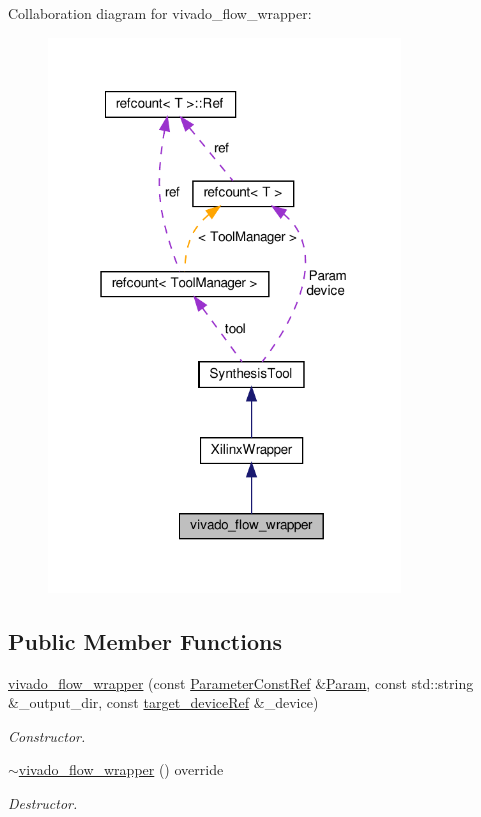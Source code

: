 Collaboration diagram for vivado\+\_\+flow\+\_\+wrapper\+:
\nopagebreak
\begin{figure}[H]
\begin{center}
\leavevmode
\includegraphics[width=265pt]{d2/d19/classvivado__flow__wrapper__coll__graph}
\end{center}
\end{figure}
\subsection*{Public Member Functions}
\begin{DoxyCompactItemize}
\item 
\hyperlink{classvivado__flow__wrapper_a8d308491e66f2a4106dd0105acee3804}{vivado\+\_\+flow\+\_\+wrapper} (const \hyperlink{Parameter_8hpp_a37841774a6fcb479b597fdf8955eb4ea}{Parameter\+Const\+Ref} \&\hyperlink{classSynthesisTool_a854ef102782ff4d069e1aa6d1a94d64e}{Param}, const std\+::string \&\+\_\+output\+\_\+dir, const \hyperlink{target__device_8hpp_acedb2b7a617e27e6354a8049fee44eda}{target\+\_\+device\+Ref} \&\+\_\+device)
\begin{DoxyCompactList}\small\item\em Constructor. \end{DoxyCompactList}\item 
\hyperlink{classvivado__flow__wrapper_ace094834eb7a691e72b05f93acd2ea8e}{$\sim$vivado\+\_\+flow\+\_\+wrapper} () override
\begin{DoxyCompactList}\small\item\em Destructor. \end{DoxyCompactList}\end{DoxyCompactItemize}
